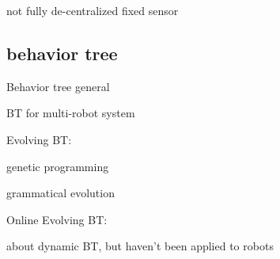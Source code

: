 not fully de-centralized
\cite{mirzaei2007performance} fixed sensor
\cite{rodrigues2015beyond}
\cite{stroupe2001distributed}
\cite{zadorozhny2013information}
\cite{sasaoka2016multi}
\cite{czarnetzki2010handling}
\cite{otte2016collective}
\cite{kornienko2005cognitive}
\cite{giusti2012cooperative}

\subsection{behavior tree}

Behavior tree general
\cite{colledanchise2018behavior}
\cite{iovino2022survey}

BT for multi-robot system
\cite{colledanchise2016advantages}
\cite{jeong2022behavior}

Evolving BT:

genetic programming
\cite{jones2018evolving}
\cite{kuckling2022automode}

grammatical evolution
\cite{neupane2019learning}
\cite{kuckling2022automode}

Online Evolving BT:

\cite{jones2019onboard}
\cite{venkata2023kt}


\cite{florez2008dynamic} about dynamic BT, but haven't been applied to robots












